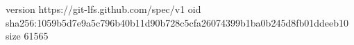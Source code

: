 version https://git-lfs.github.com/spec/v1
oid sha256:1059b5d7e9a5c796b40b11d90b728c5cfa26074399b1ba0b245d8fb01ddeeb10
size 61565
